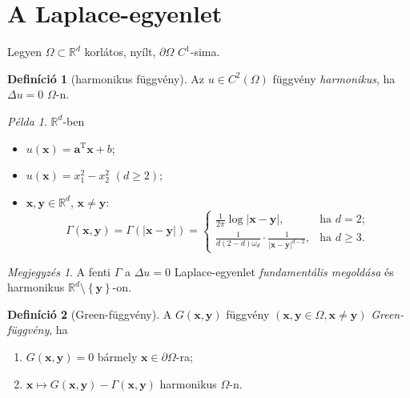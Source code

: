 \documentclass[DIV=15,appendixprefix]{scrreprt}
\theoremstyle{definition}
\newtheorem*{defin}{Definíció}
\theoremstyle{remark}
\newtheorem*{megj}{Megjegyzés}
\newtheorem*{pelda}{Példa}
\DeclareMathOperator{\T}{T}
\begin{document}
\section{A Laplace-egyenlet}
%
Legyen $ \Omega \subset \mathbb{ R }^{ d } $ korlátos, nyílt, $ \partial \Omega $ $ C^{ 1 } $-sima.
\begin{defin}[harmonikus függvény]
Az $ u \in C^{ 2 } \left( \Omega \right) $ függvény \emph{harmonikus}, ha $ \Delta u = 0 $
$ \Omega $-n.
\end{defin}
\begin{pelda}
	$\mathbb{R}^{d}$-ben
	\begin{itemize}
		\item $ u \left( \mathbf{ x } \right) = \mathbf{ a }^{ \T } \mathbf{ x } + b $;
		\item $ u \left( \mathbf{ x } \right) = x_{ 1 }^{ 2 } - x_{ 2 }^{ 2 } $ $ \left( d \ge 2
			\right) $;
		\item $ \mathbf{ x },{} \mathbf{ y } \in \mathbb{ R }^{ d } $, $ \mathbf{ x } \neq
			\mathbf{ y } $:
			\begin{equation*}
				\Gamma \left( \mathbf{ x },{} \mathbf{ y } \right) = \Gamma \left( \left|
				\mathbf{ x } - \mathbf{ y } \right| \right) = \begin{cases}
					\frac{ 1 }{ 2 \pi } \log \left| \mathbf{ x } - \mathbf{ y } \right|, &
						\text{ha } d = 2;\\
					\frac{ 1 }{ d \left( 2 - d \right) \omega_{ d } } \cdot \frac{ 1 }{ \left|
						\mathbf{ x } - \mathbf{ y } \right|^{ d - 2 } }, & \text{ha } d \ge 3.
				\end{cases}
			\end{equation*}
	\end{itemize}
\end{pelda}
\begin{megj}
	A fenti $ \Gamma $ a $ \Delta u = 0$ Laplace-egyenlet \emph{fundamentális megoldása} és
	harmonikus $ \mathbb{ R }^{ d } \setminus \left\{ \mathbf{ y } \right\} $-on.
\end{megj}
%
\begin{defin}[Green-függvény]
	A $ G \left( \mathbf{ x },{} \mathbf{ y } \right) $ függvény $ \left( \mathbf{ x },{}
	\mathbf{ y } \in \Omega,{} \mathbf{ x } \neq \mathbf{ y } \right) $ \emph{Green-függvény}, ha
	\begin{enumerate}
		\item $ G \left( \mathbf{ x },{} \mathbf{ y } \right) = 0 $ bármely $ \mathbf{ x } \in
			\partial \Omega $-ra;
		\item $ \mathbf{ x } \mapsto G \left( \mathbf{ x },{} \mathbf{ y } \right) - \Gamma \left(
			\mathbf{ x },{} \mathbf{ y } \right) $ harmonikus $\Omega$-n.
	\end{enumerate}
\end{defin}
\end{document}
